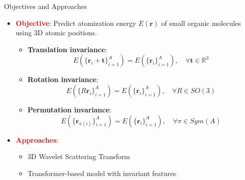 \documentclass[10pt]{beamer}
\begin{document}
\begin{frame}{Objectives and Approaches}
  \begin{itemize}
    \item \textcolor{red}{\textbf{Objective}}: Predict atomization energy \( E(\mathbf{r}) \) of small organic molecules using 3D atomic positions.
    \vspace{0.2cm}
   
    \begin{itemize}
      \item \textbf{Translation invariance}:
      \[
      E(\{\mathbf{r}_i + \mathbf{t}\}_{i=1}^A) = E(\{\mathbf{r}_i\}_{i=1}^A), \quad \forall \mathbf{t} \in \mathbb{R}^3
      \]
      \item \textbf{Rotation invariance}:
      \[
      E(\{R\mathbf{r}_i\}_{i=1}^A) = E(\{\mathbf{r}_i\}_{i=1}^A), \quad \forall R \in SO(3)
      \]
      \item \textbf{Permutation invariance}:
      \[
      E(\{\mathbf{r}_{\pi(i)}\}_{i=1}^A) = E(\{\mathbf{r}_i\}_{i=1}^A), \quad \forall \pi \in Sym(A)
      \]
    \end{itemize}
    \item \textcolor{red}{\textbf{Approaches}}:
      \begin{itemize}
        \item 3D Wavelet Scattering Transform
        \item Transformer-based model with invariant features
      \end{itemize}
    
  \end{itemize}
\end{frame}
\end{document}
